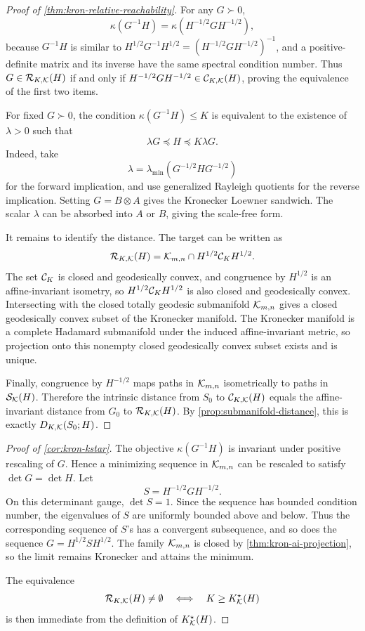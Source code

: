 \begin{proof}[Proof of \cref{thm:kron-relative-reachability}]
For any \(G\succ0\),
\[
  \kappa(G^{-1}H)
  =
  \kappa(H^{-1/2}GH^{-1/2}),
\]
because \(G^{-1}H\) is similar to
\(H^{1/2}G^{-1}H^{1/2}=(H^{-1/2}GH^{-1/2})^{-1}\), and a positive-definite
matrix and its inverse have the same spectral condition number. Thus
\(G\in\mathcal R_{K,\mathcal K}(H)\) if and only if
\(H^{-1/2}GH^{-1/2}\in\mathcal C_{K,\mathcal K}(H)\), proving the equivalence of
the first two items.

For fixed \(G\succ0\), the condition \(\kappa(G^{-1}H)\le K\) is equivalent to
the existence of \(\lambda>0\) such that
\[
  \lambda G\preceq H\preceq K\lambda G.
\]
Indeed, take
\[
  \lambda=\lambda_{\min}(G^{-1/2}HG^{-1/2})
\]
for the forward implication, and use generalized Rayleigh quotients for the
reverse implication. Setting \(G=B\otimes A\) gives the Kronecker Loewner
sandwich. The scalar \(\lambda\) can be absorbed into \(A\) or \(B\), giving
the scale-free form.

It remains to identify the distance. The target can be written as
\[
  \mathcal R_{K,\mathcal K}(H)
  =
  \mathcal K_{m,n}\cap H^{1/2}\mathcal C_K H^{1/2}.
\]
The set \(\mathcal C_K\) is closed and geodesically convex, and congruence by \(H^{1/2}\)
is an affine-invariant isometry, so \(H^{1/2}\mathcal C_K H^{1/2}\) is also closed and
geodesically convex. Intersecting with the closed totally geodesic submanifold
\(\mathcal K_{m,n}\) gives a closed geodesically convex subset of the Kronecker
manifold. The Kronecker manifold is a complete Hadamard submanifold under the
induced affine-invariant metric, so projection onto this nonempty closed
geodesically convex subset exists and is unique.

Finally, congruence by \(H^{-1/2}\) maps paths in
\(\mathcal K_{m,n}\) isometrically to paths in \(\mathcal S_{\mathcal K}(H)\). Therefore
the intrinsic distance from \(S_0\) to
\(\mathcal C_{K,\mathcal K}(H)\) equals the affine-invariant distance from \(G_0\)
to \(\mathcal R_{K,\mathcal K}(H)\). By \cref{prop:submanifold-distance}, this is
exactly \(D_{K,\mathcal K}(S_0;H)\).
\end{proof}

\begin{proof}[Proof of \cref{cor:kron-kstar}]
The objective \(\kappa(G^{-1}H)\) is invariant under positive rescaling of
\(G\). Hence a minimizing sequence in \(\mathcal K_{m,n}\) can be rescaled to satisfy
\(\det G=\det H\). Let
\[
  S=H^{-1/2}GH^{-1/2}.
\]
On this determinant gauge, \(\det S=1\). Since the sequence has bounded
condition number, the eigenvalues of \(S\) are uniformly bounded above and
below. Thus the corresponding sequence of \(S\)'s has a convergent subsequence,
and so does the sequence \(G=H^{1/2}SH^{1/2}\). The family \(\mathcal K_{m,n}\) is
closed by \cref{thm:kron-ai-projection}, so the limit remains Kronecker and
attains the minimum.

The equivalence
\[
  \mathcal R_{K,\mathcal K}(H)\ne\emptyset
  \quad\Longleftrightarrow\quad
  K\ge K_{\mathcal K}^\star(H)
\]
is then immediate from the definition of \(K_{\mathcal K}^\star(H)\).
\end{proof}

